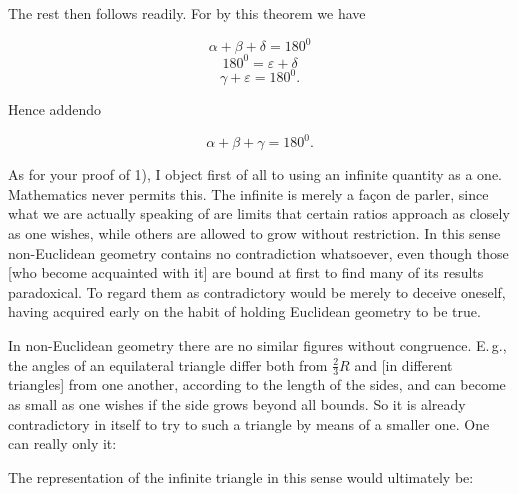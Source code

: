 

%
\noindent\begin{minipage}[t]{2.35cm}\vspace{0pt}

\end{minipage}\hfill\begin{minipage}[t]{9.9cm}\vspace{0pt}

 The rest then follows readily. For by this theorem we have

\[
\alpha+\beta+\delta=180^0
\]
\[
180^0=\varepsilon+\delta
\]
\[
\gamma+\varepsilon=180^0.
\]

 Hence addendo

\[
\alpha+\beta+\gamma=180^0.
\]

 \end{minipage}

As for your proof of 1), I object first of all to using an infinite quantity as a  one. Mathematics never permits this. The infinite is merely a façon de parler, since what we are actually speaking of are limits that certain ratios approach as closely as one wishes, while others are allowed to grow without restriction. In this sense non-Euclidean geometry contains no contradiction whatsoever, even though those [who become acquainted with it] are bound at first to find many of its results paradoxical. To regard them as contradictory would be merely to deceive oneself, having acquired early on the habit of holding Euclidean geometry to be  true.

In non-Euclidean geometry there are no similar figures without congruence. E.\,g., the angles of an equilateral triangle differ both from $\frac{2}{3}R$ and [in different triangles] from one another, according to the length of the sides, and can become as small as one wishes if the side grows beyond all bounds. So it is already contradictory in itself to try to  such a triangle by means of a smaller one. One can really only  it:

\begin{center}

\end{center}

 The representation of the infinite triangle in this sense would ultimately be:

\begin{center}

\end{center}
